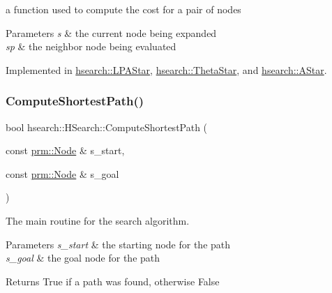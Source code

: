 a function used to compute the cost for a pair of nodes 


\begin{DoxyParams}{Parameters}
{\em s} & the current node being expanded \\
\hline
{\em sp} & the neighbor node being evaluated \\
\hline
\end{DoxyParams}


Implemented in \hyperlink{classhsearch_1_1LPAStar_aaeb55f7d05b4952247e492a7db18438d}{hsearch\+::\+L\+P\+A\+Star}, \hyperlink{classhsearch_1_1ThetaStar_a852af6d668cbb3f58079125ba5740853}{hsearch\+::\+Theta\+Star}, and \hyperlink{classhsearch_1_1AStar_a3a9a3c398437d9efe0b9943c29a8672b}{hsearch\+::\+A\+Star}.

\mbox{\label{classhsearch_1_1HSearch_a8641b99479bbdf017bf5a1168b763c27}} 
\subsubsection{\texorpdfstring{Compute\+Shortest\+Path()}{ComputeShortestPath()}}
{\footnotesize\ttfamily bool hsearch\+::\+H\+Search\+::\+Compute\+Shortest\+Path (\begin{DoxyParamCaption}\item[{const \hyperlink{structprm_1_1Node}{prm\+::\+Node} \&}]{s\+\_\+start,  }\item[{const \hyperlink{structprm_1_1Node}{prm\+::\+Node} \&}]{s\+\_\+goal }\end{DoxyParamCaption})\hspace{0.3cm}{\ttfamily [virtual]}}



The main routine for the search algorithm. 


\begin{DoxyParams}{Parameters}
{\em s\+\_\+start} & the starting node for the path \\
\hline
{\em s\+\_\+goal} & the goal node for the path \\
\hline
\end{DoxyParams}
\begin{DoxyReturn}{Returns}
True if a path was found, otherwise False 
\end{DoxyReturn}
\mbox{\label{classhsearch_1_1HSearch_a6ca884af67da489fa1b20592abc1dbba}} 
